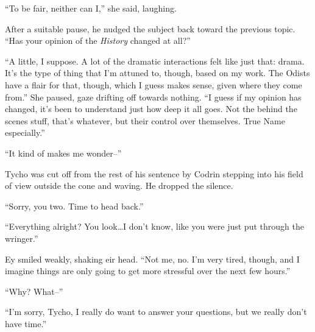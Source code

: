 ``To be fair, neither can I,'' she said, laughing.

After a suitable pause, he nudged the subject back toward the previous topic. ``Has your opinion of the \emph{History} changed at all?''

``A little, I suppose. A lot of the dramatic interactions felt like just that: drama. It's the type of thing that I'm attuned to, though, based on my work. The Odists have a flair for that, though, which I guess makes sense, given where they come from.'' She paused, gaze drifting off towards nothing. ``I guess if my opinion has changed, it's been to understand just how deep it all goes. Not the behind the scenes stuff, that's whatever, but their control over themselves. True Name especially.''

``It kind of makes me wonder--''

Tycho was cut off from the rest of his sentence by Codrin stepping into his field of view outside the cone and waving. He dropped the silence.

``Sorry, you two. Time to head back.''

``Everything alright? You look\ldots I don't know, like you were just put through the wringer.''

Ey smiled weakly, shaking eir head. ``Not me, no. I'm very tired, though, and I imagine things are only going to get more stressful over the next few hours.''

``Why? What--''

``I'm sorry, Tycho, I really do want to answer your questions, but we really don't have time.''
